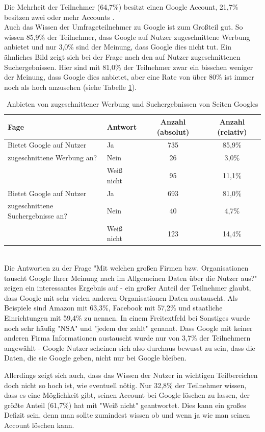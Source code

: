 Die Mehrheit der Teilnehmer (64,7\%) besitzt einen Google Account, 21,7\% besitzen zwei oder mehr Accounts .\\
Auch das Wissen der Umfrageteilnehmer zu Google ist zum Großteil gut. So wissen 85,9\% der Teilnehmer, dass Google auf Nutzer zugeschnittene Werbung anbietet und nur 3,0\% sind der Meinung, dass Google dies nicht tut. Ein ähnliches Bild zeigt sich bei der Frage nach den auf Nutzer zugeschnittenen Suchergebnissen. Hier sind mit 81,0\% der Teilnehmer zwar ein bisschen weniger der Meinung, dass Google dies anbietet, aber eine Rate von über 80\% ist immer noch als hoch anzusehen (siehe Tabelle \ref{fittingAdsAndSearch}).\\
\begin{table}
	\begin{tabular}[]{ l | l | c | c}
		\hline
		Fage & Antwort & Anzahl (absolut) & Anzahl (relativ)\\ \hline \hline
		Bietet Google auf Nutzer& Ja & 735 & 85,9\%\\
		zugeschnittene Werbung an? & Nein & 26 & 3,0\%\\
		& Weiß nicht & 95 & 11,1\% \\
		\hline
		Bietet Google auf Nutzer& Ja & 693 & 81,0\% \\
		zugeschnittene Suchergebnisse an? & Nein & 40 & 4,7\% \\
		& Weiß nicht & 123 & 14,4\% \\
		 \hline
	\end{tabular}
	\caption{Anbieten von zugeschnittener Werbung und Suchergebnissen von Seiten Googles}\label{fittingAdsAndSearch}
\end{table}\\
Die Antworten zu der Frage "Mit welchen großen Firmen bzw. Organisationen tauscht Google Ihrer Meinung nach im Allgemeinen Daten über die Nutzer aus?" zeigen ein interessantes Ergebnis auf - ein großer Anteil der Teilnehmer glaubt, dass Google mit sehr vielen anderen Organisationen Daten austauscht. Als Beispiele sind Amazon mit 63,3\%, Facebook mit 57,2\% und staatliche Einrichtungen mit 59,4\% zu nennen. In einem Freitextfeld bei Sonstiges wurde noch sehr häufig "NSA" und "jedem der zahlt" genannt. Dass Google mit keiner anderen Firma Informationen austauscht wurde nur von 3,7\% der Teilnehmern angewählt - Google Nutzer scheinen sich also durchaus bewusst zu sein, dass die Daten, die sie Google geben, nicht nur bei Google bleiben.

Allerdings zeigt sich auch, dass das Wissen der Nutzer in wichtigen Teilbereichen doch nicht so hoch ist, wie eventuell nötig. Nur 32,8\% der  Teilnehmer wissen, dass es eine Möglichkeit gibt, seinen Account bei Google löschen zu lassen, der größte Anteil (61,7\%) hat mit "Weiß nicht" geantwortet. Dies kann ein großes Defizit sein, denn man sollte zumindest wissen ob und wenn ja wie man seinen Account löschen kann.

